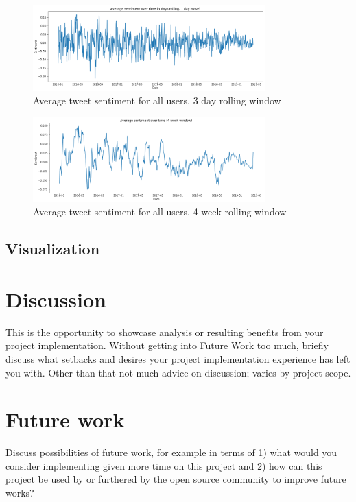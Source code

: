 \documentclass[12pt]{article}
\begin{document}
\begin{figure}[h!]
    \centering
     \includegraphics[width=0.8\textwidth]{avg_sentiment_over_time_big__3day}
        \caption{Average tweet sentiment for all users, 3 day rolling window}
\end{figure}

\begin{figure}[h!]
    \centering
     \includegraphics[width=0.8\textwidth]{avg_sentiment_over_time_big_4week}
        \caption{Average tweet sentiment for all users, 4 week rolling window}
\end{figure}

\subsection{Visualization}


\section{Discussion}
This is the opportunity to showcase analysis or resulting benefits from your project implementation. Without getting into Future Work too much, briefly discuss what setbacks and desires your project implementation experience has left you with. Other than that not much advice on discussion; varies by project scope. 


\section{Future work}
Discuss possibilities of future work, for example in terms of 1) what would you consider implementing given more time on this project and 2) how can this project be used by or furthered by the open source community to improve future works?
\end{document}
